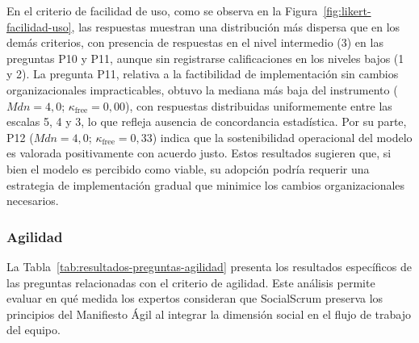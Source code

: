 En el criterio de facilidad de uso, como se observa en la Figura~\ref{fig:likert-facilidad-uso}, las respuestas muestran una distribución más dispersa que en los demás criterios, con presencia de respuestas en el nivel intermedio (3) en las preguntas P10 y P11, aunque sin registrarse calificaciones en los niveles bajos (1 y 2). La pregunta P11, relativa a la factibilidad de implementación sin cambios organizacionales impracticables, obtuvo la mediana más baja del instrumento ($Mdn = 4{,}0$; $\kappa_{\text{free}} = 0{,}00$), con respuestas distribuidas uniformemente entre las escalas 5, 4 y 3, lo que refleja ausencia de concordancia estadística. Por su parte, P12 ($Mdn = 4{,}0$; $\kappa_{\text{free}} = 0{,}33$) indica que la sostenibilidad operacional del modelo es valorada positivamente con acuerdo justo. Estos resultados sugieren que, si bien el modelo es percibido como viable, su adopción podría requerir una estrategia de implementación gradual que minimice los cambios organizacionales necesarios.



\subsubsection{Agilidad}

La Tabla~\ref{tab:resultados-preguntas-agilidad} presenta los resultados específicos de las preguntas relacionadas con el criterio de agilidad. Este análisis permite evaluar en qué medida los expertos consideran que SocialScrum preserva los principios del Manifiesto Ágil al integrar la dimensión social en el flujo de trabajo del equipo.

\begingroup
\scriptsize
\renewcommand{\arraystretch}{1.4}
\setlength{\tabcolsep}{4pt}
\setlength{\LTleft}{0pt}
\setlength{\LTright}{0pt}

